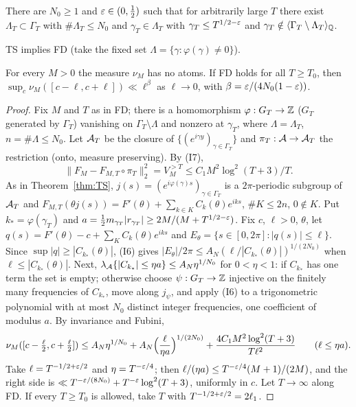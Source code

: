 \begin{hypothesis}
There are $N_0\ge1$ and $\varepsilon\in(0,\frac12)$ such that for arbitrarily large $T$ there exist $\Lambda_T\subset\Gamma_T$ with $\#\Lambda_T\le N_0$ and $\gamma_T\in\Lambda_T$ with $\gamma_T\le T^{1/2-\varepsilon}$ and $\gamma_T\notin\langle\Gamma_T\setminus\Lambda_T\rangle_{\mathbb Q}$.
\end{hypothesis}

TS implies FD (take the fixed set $\Lambda=\{\gamma:\varphi(\gamma)\ne0\}$).

\begin{theorem}\label{thm:FD}
For every $M>0$ the measure $\nu_M$ has no atoms. If FD holds for all $T\ge T_0$, then $\sup_c\nu_M([c-\ell,c+\ell])\ll\ell^\beta$ as $\ell\to0$, with $\beta=\varepsilon/(4N_0(1-\varepsilon))$.
\end{theorem}

\begin{proof}
Fix $M$ and $T$ as in FD; there is a homomorphism $\varphi:G_T\to\mathbb Z$ ($G_T$ generated by $\Gamma_T$) vanishing on $\Gamma_T\setminus\Lambda$ and nonzero at $\gamma_T$, where $\Lambda=\Lambda_T$, $n=\#\Lambda\le N_0$. Let $\mathcal A_T$ be the closure of $\{(e^{i\gamma y})_{\gamma\in\Gamma_T}\}$ and $\pi_T:\mathcal A\to\mathcal A_T$ the restriction (onto, measure preserving). By (I7),
\[
\|F_M-F_{M,T}\circ\pi_T\|_2^2=V_M^{>T}\le C_1M^2\log^2(T+3)/T.
\]
As in Theorem~\ref{thm:TS}, $j(s)=(e^{i\varphi(\gamma)s})_{\gamma\in\Gamma_T}$ is a $2\pi$-periodic subgroup of $\mathcal A_T$ and $F_{M,T}(\theta j(s))=F'(\theta)+\sum_{k\in K}C_k(\theta)e^{iks}$, $\#K\le2n$, $0\notin K$. Put $k_*=\varphi(\gamma_T)$ and $a=\frac12m_{\gamma_T}|r_{\gamma_T}|\ge2M/(M+T^{1/2-\varepsilon})$. Fix $c$, $\ell>0$, $\theta$, let $q(s)=F'(\theta)-c+\sum_KC_k(\theta)e^{iks}$ and $E_\theta=\{s\in[0,2\pi]:|q(s)|\le\ell\}$. Since $\sup|q|\ge|C_{k_*}(\theta)|$, (I6) gives $|E_\theta|/2\pi\le A_N(\ell/|C_{k_*}(\theta)|)^{1/(2N_0)}$ when $\ell\le|C_{k_*}(\theta)|$. Next, $\lambda_{\mathcal A}\{|C_{k_*}|\le\eta a\}\le A_N\eta^{1/N_0}$ for $0<\eta<1$: if $C_{k_*}$ has one term the set is empty; otherwise choose $\psi:G_T\to\mathbb Z$ injective on the finitely many frequencies of $C_{k_*}$, move along $j_\psi$, and apply (I6) to a trigonometric polynomial with at most $N_0$ distinct integer frequencies, one coefficient of modulus $a$. By invariance and Fubini,
\[
\nu_M([c-\tfrac\ell2,c+\tfrac\ell2])\le A_N\eta^{1/N_0}+A_N\Bigl(\frac\ell{\eta a}\Bigr)^{1/(2N_0)}+\frac{4C_1M^2\log^2(T+3)}{T\ell^2}\qquad(\ell\le\eta a).
\]
Take $\ell=T^{-1/2+\varepsilon/2}$ and $\eta=T^{-\varepsilon/4}$; then $\ell/(\eta a)\le T^{-\varepsilon/4}(M+1)/(2M)$, and the right side is $\ll T^{-\varepsilon/(8N_0)}+T^{-\varepsilon}\log^2(T+3)$, uniformly in $c$. Let $T\to\infty$ along FD. If every $T\ge T_0$ is allowed, take $T$ with $T^{-1/2+\varepsilon/2}=2\ell_1$.
\end{proof}

